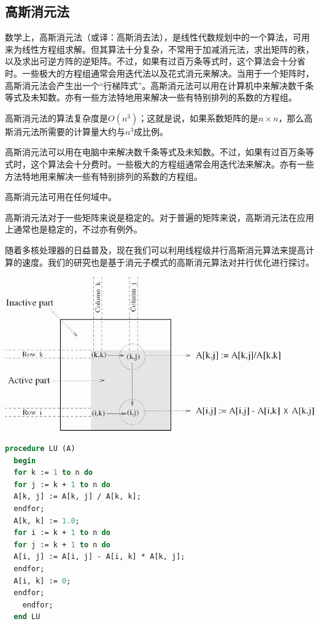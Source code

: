\documentclass[a4paper]{article}
\begin{document}
\subsection{高斯消元法}

数学上，高斯消元法（或译：高斯消去法），是线性代数规划中的一个算法，可用来为线性方程组求解。但其算法十分复杂，不常用于加减消元法，求出矩阵的秩，以及求出可逆方阵的逆矩阵。不过，如果有过百万条等式时，这个算法会十分省时。一些极大的方程组通常会用迭代法以及花式消元来解决。当用于一个矩阵时，高斯消元法会产生出一个“行梯阵式”。高斯消元法可以用在计算机中来解决数千条等式及未知数。亦有一些方法特地用来解决一些有特别排列的系数的方程组。

高斯消元法的算法复杂度是$O(n^3)$；这就是说，如果系数矩阵的是$n×n$，那么高斯消元法所需要的计算量大约与$n^3$成比例。

高斯消元法可以用在电脑中来解决数千条等式及未知数。不过，如果有过百万条等式时，这个算法会十分费时。一些极大的方程组通常会用迭代法来解决。亦有一些方法特地用来解决一些有特别排列的系数的方程组。

高斯消元法可用在任何域中。

高斯消元法对于一些矩阵来说是稳定的。对于普遍的矩阵来说，高斯消元法在应用上通常也是稳定的，不过亦有例外。

随着多核处理器的日益普及，现在我们可以利用线程级并行高斯消元算法来提高计算的速度。我们的研究也是基于消元子模式的高斯消元算法对并行优化进行探讨。

\includegraphics[width=\textwidth]{gauss-alg.jpg}

\begin{lstlisting}[title=普通高斯消去算法,frame=trbl,language={Pascal}]
  procedure LU (A)
  begin
  for k := 1 to n do
  for j := k + 1 to n do
  A[k, j] := A[k, j] / A[k, k];
  endfor;
  A[k, k] := 1.0;
  for i := k + 1 to n do
  for j := k + 1 to n do
  A[i, j] := A[i, j] - A[i, k] * A[k, j];
  endfor;
  A[i, k] := 0;
  endfor;
    endfor;
  end LU
\end{lstlisting}
\end{document}
